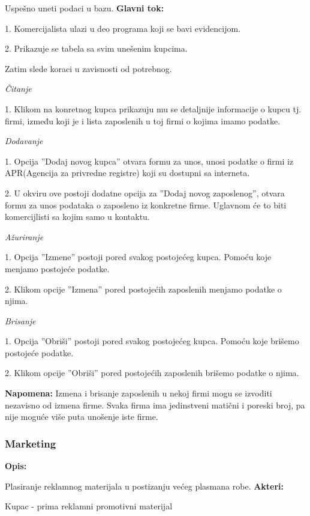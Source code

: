 Uspešno uneti podaci u bazu.
\newline
\textbf{Glavni tok:}

1. Komercijalista ulazi u deo programa koji se bavi evidencijom.

2. Prikazuje se tabela sa svim unešenim kupcima. 

Zatim slede koraci u zavisnosti od potrebnog.

\textit{Čitanje}

1. Klikom na konretnog kupca prikazuju mu se detaljnije 	informacije o kupcu tj. firmi, između koji je i lista zaposlenih u toj firmi o kojima imamo podatke.

\textit{Dodavanje}

1. Opcija ”Dodaj novog kupca” otvara formu za unos, unosi podatke o firmi iz APR(Agencija za privredne registre) koji su dostupni sa interneta.

2. U okviru ove postoji dodatne opcija za ”Dodaj novog zaposlenog”, otvara formu za unos podataka o zaposleno iz konkretne firme. Uglavnom će to biti komercijlisti sa kojim samo u kontaktu.

\textit{Ažuriranje}

1. Opcija ”Izmene” postoji pored svakog postojećeg kupca. Pomoću koje menjamo postojeće podatke.

2. Klikom opcije ”Izmena” pored postojećih zaposlenih menjamo podatke o njima.

\textit{Brisanje}

1. Opcija ”Obriši” postoji pored svakog postojećeg kupca. Pomoću koje brišemo postojeće podatke.

2. Klikom opcije ”Obriši” pored postojećih zaposlenih brišemo podatke o njima.

\textbf{Napomena:}
Izmena i brisanje zaposlenih u nekoj firmi mogu se izvoditi nezavisno od izmena firme.
Svaka firma ima jedinstveni matični i poreski broj, pa nije moguće više puta unošenje iste firme.

\clearpage

\subsubsection{Marketing}

\textbf{Opis:}

Plasiranje reklamnog materijala u postizanju većeg plasmana robe.
\newline
\textbf{Akteri:}

Kupac - prima reklamni promotivni materijal

